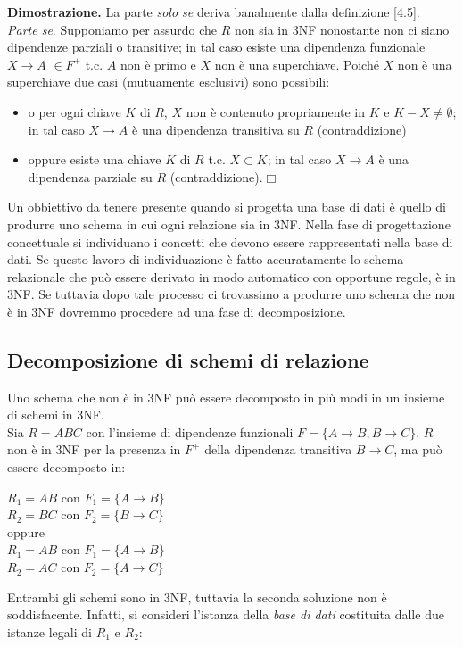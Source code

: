 \textbf{Dimostrazione.} La parte \emph{solo se} deriva banalmente dalla definizione [4.5].\\
\emph{Parte se}. Supponiamo per assurdo che $R$ non sia in 3NF nonostante non ci siano
dipendenze parziali o transitive; in tal caso esiste una dipendenza funzionale $X\rightarrow A$
$\in F^+$ t.c. $A$ non è primo e $X$ non è una superchiave. Poiché $X$ non è una
superchiave due casi (mutuamente esclusivi) sono possibili:
\begin{itemize}
 \item o per ogni chiave $K$ di $R$, $X$ non è contenuto propriamente in $K$ e $K-X \neq 
 \emptyset$; in tal caso $X\rightarrow A$ è una dipendenza transitiva su $R$ (contraddizione)
 \item oppure esiste una chiave $K$ di $R$ t.c. $X \subset K$; in tal caso $X\rightarrow A$ 
 è una dipendenza parziale su $R$ (contraddizione).\hfill $\Box$
\end{itemize}
Un obbiettivo da tenere presente quando si progetta una base di dati è quello di produrre 
uno schema in cui ogni relazione sia in 3NF. Nella fase di progettazione concettuale si 
individuano i concetti che devono essere rappresentati nella base di dati. Se questo lavoro 
di individuazione è fatto accuratamente lo schema relazionale che può essere derivato in modo
automatico con opportune regole, è in 3NF. Se tuttavia dopo tale processo ci trovassimo a 
produrre uno schema che non è in 3NF dovremmo procedere ad una fase di decomposizione.

\subsection{Decomposizione di schemi di relazione}
Uno schema che non è in 3NF può essere decomposto in più modi in un insieme di schemi in 3NF.\\
 Sia $R = ABC$ con l'insieme di dipendenze funzionali $F = \{A\rightarrow B, B\rightarrow C\}$.
$R$ non è in 3NF per la presenza in $F^+$ della dipendenza transitiva $B\rightarrow C$, ma può 
essere decomposto in:
\begin{center}
  $R_1 = AB$ con $F_1=\{A\rightarrow B\}$\\
  $R_2 = BC$ con $F_2=\{B\rightarrow C\}$\\
  oppure\\
  $R_1 = AB$ con $F_1=\{A\rightarrow B\}$\\
  $R_2 = AC$ con $F_2=\{A\rightarrow C\}$\\
\end{center}
Entrambi gli schemi sono in 3NF, tuttavia la seconda soluzione non è soddisfacente. Infatti,
si consideri l'istanza della \emph{base di dati} costituita dalle due istanze legali di $R_1$ e $R_2$:

